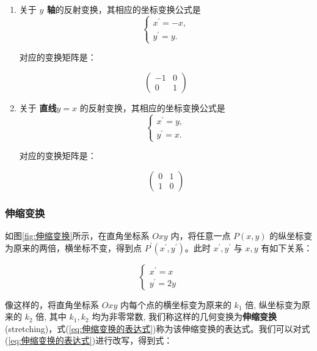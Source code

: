 \begin{solution}

\begin{enumerate}
    \item 关于 \textbf{$y$ 轴}的反射变换，其相应的坐标变换公式是
$$
\left\{\begin{array}{c}
x^{\prime}=-x, \\
y^{\prime}=y .
\end{array}\right.
$$

对应的变换矩阵是：

$$
 \left(\begin{array}{cc}-1 & 0 \\ 0 & 1\end{array}\right)
$$
\item 关于 \textbf{直线$y=x$} 的反射变换，其相应的坐标变换公式是
$$
\left\{\begin{array}{c}
x^{\prime}=y, \\
y^{\prime}=x .
\end{array}\right.
$$

对应的变换矩阵是：

$$
 \left(\begin{array}{cc}0 & 1 \\ 1 & 0\end{array}\right)
$$
\end{enumerate}
\end{solution}

\subsubsection{伸缩变换}
\label{subsubsec:伸缩变换}

如图\ref{fig:伸缩变换}所示，在直角坐标系 $O x y$ 内，将任意一点 $P(x, y)$ 的纵坐标变为原来的两倍，横坐标不变，得到点 $P^{\prime}\left(x^{\prime}, y^{\prime}\right)$。此时 $x^{\prime}, y^{\prime}$ 与 $x, y$ 有如下关系：

\begin{equation}
\left\{\begin{array}{l}
x^{\prime}=x \\
y^{\prime}=2 y
\end{array}\right.
\label{eq:伸缩变换的表达式}
\end{equation}

像这样的，将直角坐标系 $O x y$ 内每个点的横坐标变为原来的 $k_1$ 倍, 纵坐标变为原来的 $k_2$ 倍, 其中 $k_1, k_2$ 均为非零常数, 我们称这样的几何变换为\textcolor{third}{\bf 伸缩变换} (stretching)，式(\ref{eq:伸缩变换的表达式})称为该伸缩变换的表达式。我们可以对式(\ref{eq:伸缩变换的表达式})进行改写，得到式：

